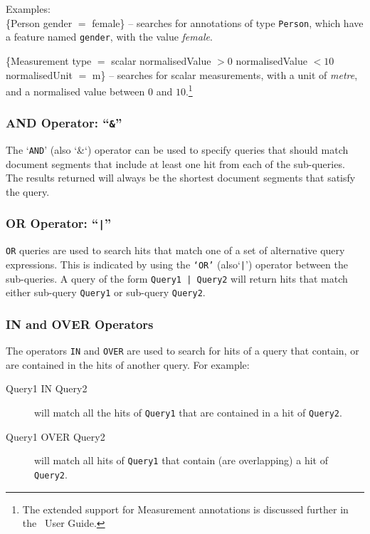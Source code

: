 Examples:\\
\{Person gender $=$ female\} -- searches for annotations of type
{\tt Person}, which have a feature named {\tt gender}, with the value
{\it female}.

\{Measurement type $=$ scalar normalisedValue $>0$ normalisedValue $<10$
normalisedUnit $=$ m\} -- searches for scalar measurements, with a unit of {\it
metre}, and a normalised value between $0$ and $10$.\footnote{The extended
support for Measurement annotations is discussed further in
the \Mimir\ User Guide.}

\subsubsection{AND Operator: ``{\tt \&}''}\label{sec:mimir-search:and-query}

The `{\tt AND}' (also `\&`) operator can be used to specify queries that should
match document segments that include at least one hit from each of the
sub-queries. The results returned will always be the shortest document segments
that satisfy the query.

\subsubsection{OR Operator: ``{\tt |}''}\label{sec:mimir-search:or-query}

{\tt OR} queries are used to search hits that match one of a set of alternative
query expressions. This is indicated by using the {\tt `OR'} (also`\verb!|!')
operator between the sub-queries. A query of the form {\tt Query1 | Query2} will
return hits that match either sub-query {\tt Query1} or sub-query {\tt Query2}.

\subsubsection{IN and OVER Operators}\label{sec:containment-query}

The operators {\tt IN} and {\tt OVER} are used to search for hits of a query
that contain, or are contained in the hits of another query. For example:
\begin{description}
\item[Query1 IN Query2] will match all the hits of {\tt Query1} that are
contained in a hit of {\tt Query2}.
\item[Query1 OVER Query2] will match all hits of {\tt Query1} that contain (are
overlapping) a hit of {\tt Query2}.
\end{description}

